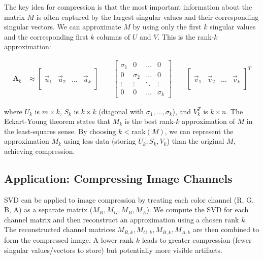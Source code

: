 \documentclass{article}
\begin{document}
The key idea for compression is that the most important information about the matrix $M$ is often captured by the largest singular values and their corresponding singular vectors. We can approximate $M$ by using only the first $k$ singular values and the corresponding first $k$ columns of $U$ and $V$. This is the rank-$k$ approximation:

\begin{align*}
\mathbf{A}_k &\approx
\left[ \begin{array}{c|c|c|c}
\, & \, & \, & \, \\ %
\vec{u}_1 & \vec{u}_2 & \dots & \vec{u}_k \\
\, & \, & \, & \, %
\end{array} \right]
\qquad
\begin{bmatrix}
\sigma_1 & 0 & \dots & 0 \\
0 & \sigma_2 & \dots & 0 \\
\vdots & \vdots & \ddots & \vdots \\
0 & 0 & \dots & \sigma_k
\end{bmatrix}
\qquad
\left[ \begin{array}{c|c|c|c}
\, & \, & \, & \, \\ %
\vec{v}_1 & \vec{v}_2 & \dots & \vec{v}_k \\
\, & \, & \, & \, %
\end{array} \right]^T
\end{align*}

where $U_k$ is $m \times k$, $S_k$ is $k \times k$ (diagonal with $\sigma_1, \dots, \sigma_k$), and $V_k^T$ is $k \times n$. The Eckart-Young theorem states that $M_k$ is the best rank-$k$ approximation of $M$ in the least-squares sense. By choosing $k < \text{rank}(M)$, we can represent the approximation $M_k$ using less data (storing $U_k, S_k, V_k$) than the original $M$, achieving compression.

\subsection{Application: Compressing Image Channels}
SVD can be applied to image compression by treating each color channel (R, G, B, A) as a separate matrix ($M_R, M_G, M_B, M_A$). We compute the SVD for each channel matrix and then reconstruct an approximation using a chosen rank $k$. The reconstructed channel matrices $M_{R,k}, M_{G,k}, M_{B,k}, M_{A,k}$ are then combined to form the compressed image. A lower rank $k$ leads to greater compression (fewer singular values/vectors to store) but potentially more visible artifacts.
\end{document}
